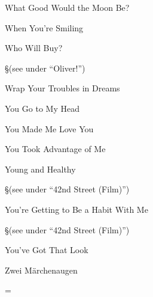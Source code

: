 \N What Good Would the Moon Be?


\N When You're Smiling


\N Who Will Buy?

\nobreak
\S (see under ``Oliver!'')

\N Wrap Your Troubles in Dreams


\N You Go to My Head


\N You Made Me Love You


\N You Took Advantage of Me


\N Young and Healthy

\nobreak
\S (see under ``42nd Street (Film)'')

\N You're Getting to Be a Habit With Me

\nobreak
\S (see under ``42nd Street (Film)'')

\N You've Got That Look


\N Zwei M{\"a}rchenaugen


\singlecolumn
\vfil\eject
\pagecnt=\pageno
\endinput

